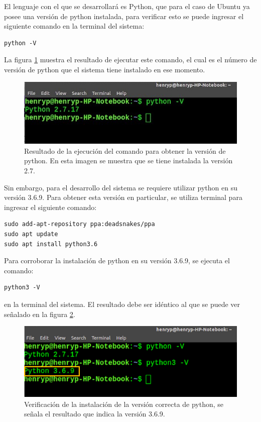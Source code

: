 {{\noindent El lenguaje con el que se desarrollará es Python, que para el caso de Ubuntu ya posee una versión de python instalada, para verificar esto se puede ingresar el siguiente comando en la terminal del sistema:
\begin{lstlisting}
python -V
\end{lstlisting}
La figura \ref{2.2.1} muestra el resultado de ejecutar este comando, el cual es el número de versión de python que el sistema tiene instalado en ese momento.

\begin{figure}[H]
    \centering
    \includegraphics[scale=0.85]{Capitulo4/Documentos/imagenes_entorno/figura2-2-1.jpg}
    \caption{Resultado de la ejecución del comando para obtener la versión de python. En esta imagen se muestra que se tiene instalada la versión 2.7.}
    \label{2.2.1}
\end{figure}
\newpage
\noindent Sin embargo, para el desarrollo del sistema se requiere utilizar python en su versión 3.6.9. Para obtener esta versión en particular, se utiliza terminal para ingresar el siguiente comando:

\begin{lstlisting}
sudo add-apt-repository ppa:deadsnakes/ppa
sudo apt update
sudo apt install python3.6
\end{lstlisting}
\noindent Para corroborar la instalación de python en su versión 3.6.9, se ejecuta el comando:

\begin{lstlisting}
python3 -V
\end{lstlisting}
\noindent en la terminal del sistema. El resultado debe ser idéntico al que se puede ver señalado en la figura \ref{2.2.2}.
\begin{figure}[H]
    \centering
    \includegraphics[scale=0.85]{Capitulo4/Documentos/imagenes_entorno/figura2-2-2.png}
    \caption{Verificación de la instalación de la versión correcta de python, se señala el resultado que indica la versión 3.6.9.}
    \label{2.2.2}
\end{figure}

}}
